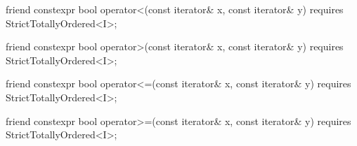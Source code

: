 {\begin{itemdescr}
\pnum
\oldtxt{\returns} 
\end{itemdescr}

\begin{itemdecl}
friend constexpr bool operator<(const iterator& x, const iterator& y)
  requires StrictTotallyOrdered<I>;
\end{itemdecl}

\begin{itemdescr}
\pnum
\oldtxt{\returns} 
\end{itemdescr}

\begin{itemdecl}
friend constexpr bool operator>(const iterator& x, const iterator& y)
  requires StrictTotallyOrdered<I>;
\end{itemdecl}

\begin{itemdescr}
\pnum
\oldtxt{\returns} 
\end{itemdescr}

\begin{itemdecl}
friend constexpr bool operator<=(const iterator& x, const iterator& y)
  requires StrictTotallyOrdered<I>;
\end{itemdecl}

\begin{itemdescr}
\pnum
\oldtxt{\returns} 
\end{itemdescr}

\begin{itemdecl}
friend constexpr bool operator>=(const iterator& x, const iterator& y)
  requires StrictTotallyOrdered<I>;
\end{itemdecl}

\begin{itemdescr}
\pnum
\oldtxt{\returns} 
\end{itemdescr}

}
